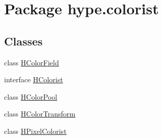 \hypertarget{namespacehype_1_1colorist}{\section{Package hype.\-colorist}
\label{namespacehype_1_1colorist}
}
\subsection*{Classes}
\begin{DoxyCompactItemize}
\item 
class \hyperlink{classhype_1_1colorist_1_1_h_color_field}{H\-Color\-Field}
\item 
interface \hyperlink{interfacehype_1_1colorist_1_1_h_colorist}{H\-Colorist}
\item 
class \hyperlink{classhype_1_1colorist_1_1_h_color_pool}{H\-Color\-Pool}
\item 
class \hyperlink{classhype_1_1colorist_1_1_h_color_transform}{H\-Color\-Transform}
\item 
class \hyperlink{classhype_1_1colorist_1_1_h_pixel_colorist}{H\-Pixel\-Colorist}
\end{DoxyCompactItemize}
